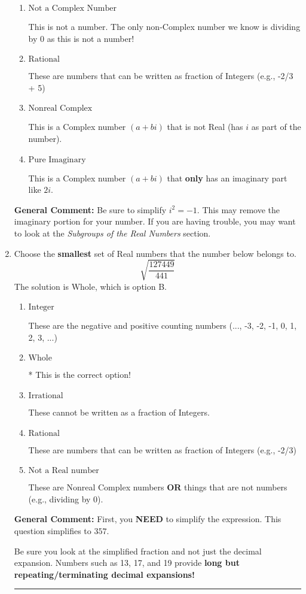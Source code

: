 \documentclass{extbook}[14pt]
\newcommand{\litem}[1]{\item #1

\rule{\textwidth}{0.4pt}}
\begin{document}
\begin{enumerate}
{\begin{enumerate}[label=\Alph*.]
* This is the correct option!
\item \( \text{Not a Complex Number} \)

This is not a number. The only non-Complex number we know is dividing by 0 as this is not a number!
\item \( \text{Rational} \)

These are numbers that can be written as fraction of Integers (e.g., -2/3 + 5)
\item \( \text{Nonreal Complex} \)

This is a Complex number $(a+bi)$ that is not Real (has $i$ as part of the number).
\item \( \text{Pure Imaginary} \)

This is a Complex number $(a+bi)$ that \textbf{only} has an imaginary part like $2i$.
\end{enumerate}

\textbf{General Comment:} Be sure to simplify $i^2 = -1$. This may remove the imaginary portion for your number. If you are having trouble, you may want to look at the \textit{Subgroups of the Real Numbers} section.
}
\litem{
Choose the \textbf{smallest} set of Real numbers that the number below belongs to.
\[ \sqrt{\frac{127449}{441}} \]The solution is \( \text{Whole} \), which is option B.\begin{enumerate}[label=\Alph*.]
\item \( \text{Integer} \)

These are the negative and positive counting numbers (..., -3, -2, -1, 0, 1, 2, 3, ...)
\item \( \text{Whole} \)

* This is the correct option!
\item \( \text{Irrational} \)

These cannot be written as a fraction of Integers.
\item \( \text{Rational} \)

These are numbers that can be written as fraction of Integers (e.g., -2/3)
\item \( \text{Not a Real number} \)

These are Nonreal Complex numbers \textbf{OR} things that are not numbers (e.g., dividing by 0).
\end{enumerate}

\textbf{General Comment:} First, you \textbf{NEED} to simplify the expression. This question simplifies to $357$. 
 
 Be sure you look at the simplified fraction and not just the decimal expansion. Numbers such as 13, 17, and 19 provide \textbf{long but repeating/terminating decimal expansions!} 
 
}
\end{enumerate}
\end{document}
